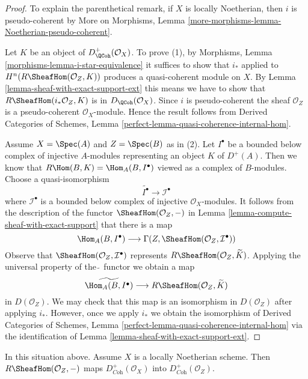 \begin{proof}
To explain the parenthetical remark, if $X$ is locally Noetherian, then
$i$ is pseudo-coherent by
More on Morphisms, Lemma \ref{more-morphisms-lemma-Noetherian-pseudo-coherent}.

\medskip\noindent
Let $K$ be an object of $D^+_\QCoh(\mathcal{O}_X)$. To prove (1), by
Morphisms, Lemma \ref{morphisms-lemma-i-star-equivalence}
it suffices to show that $i_*$ applied to
$H^n(R\SheafHom(\mathcal{O}_Z, K))$ produces a
quasi-coherent module on $X$. By
Lemma \ref{lemma-sheaf-with-exact-support-ext}
this means we have to show that $R\SheafHom(i_*\mathcal{O}_Z, K)$
is in $D_\QCoh(\mathcal{O}_X)$. Since $i$ is pseudo-coherent
the sheaf $\mathcal{O}_Z$ is a pseudo-coherent $\mathcal{O}_X$-module.
Hence the result follows from
Derived Categories of Schemes, Lemma
\ref{perfect-lemma-quasi-coherence-internal-hom}.

\medskip\noindent
Assume $X = \Spec(A)$ and $Z = \Spec(B)$ as in (2).
Let $I^\bullet$ be a bounded below complex of injective $A$-modules
representing an object $K$ of $D^+(A)$.
Then we know that $R\Hom(B, K) = \Hom_A(B, I^\bullet)$ viewed
as a complex of $B$-modules. Choose a quasi-isomorphism
$$
\widetilde{I^\bullet} \longrightarrow \mathcal{I}^\bullet
$$
where $\mathcal{I}^\bullet$ is a bounded below complex of injective
$\mathcal{O}_X$-modules. It follows from the description of
the functor $\SheafHom(\mathcal{O}_Z, -)$ in
Lemma \ref{lemma-compute-sheaf-with-exact-support}
that there is a map
$$
\Hom_A(B, I^\bullet)
\longrightarrow
\Gamma(Z, \SheafHom(\mathcal{O}_Z, \mathcal{I}^\bullet))
$$
Observe that $\SheafHom(\mathcal{O}_Z, \mathcal{I}^\bullet)$
represents $R\SheafHom(\mathcal{O}_Z, \widetilde{K})$.
Applying the universal property of the $\widetilde{\ }$ functor we
obtain a map
$$
\widetilde{\Hom_A(B, I^\bullet)}
\longrightarrow
R\SheafHom(\mathcal{O}_Z, \widetilde{K})
$$
in $D(\mathcal{O}_Z)$. We may check that this map is an isomorphism in
$D(\mathcal{O}_Z)$ after applying $i_*$. However, once we apply
$i_*$ we obtain the isomorphism of Derived Categories of Schemes,
Lemma \ref{perfect-lemma-quasi-coherence-internal-hom}
via the identification of
Lemma \ref{lemma-sheaf-with-exact-support-ext}.
\end{proof}

\begin{lemma}
\label{lemma-sheaf-with-exact-support-coherent}
In this situation above. Assume $X$ is a locally Noetherian scheme.
Then $R\SheafHom(\mathcal{O}_Z, -)$ maps $D^+_{\textit{Coh}}(\mathcal{O}_X)$
into $D^+_{\textit{Coh}}(\mathcal{O}_Z)$.
\end{lemma}

